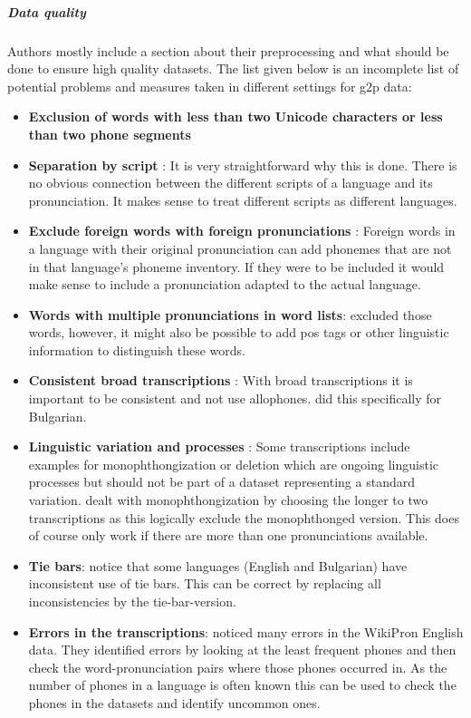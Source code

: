 \subparagraph{Data quality}
\label{data_qual}
Authors mostly include a section about their preprocessing and what should be done to ensure high quality datasets. The list given below is an incomplete list of potential problems and measures taken in different settings for \ac{g2p} data:

\begin{itemize}
\item \textbf{Exclusion of words with less than two Unicode characters or less than two phone segments} \citep{Ashby-Bartley.2021} 
\item \textbf{Separation by script} \citep{Ashby-Bartley.2021}: It is very straightforward why this is done. There is no obvious connection between the different scripts of a language and its pronunciation. It makes sense to treat different scripts as different languages. 
\item \textbf{Exclude foreign words with foreign pronunciations} \citep{Ashby-Bartley.2021}: Foreign words in a language with their original pronunciation can add phonemes that are not in that language's phoneme inventory. If they were to be included it would make sense to include a pronunciation adapted to the actual language.
\item \textbf{Words with multiple pronunciations in word lists}: \cite{Ashby-Bartley.2021} excluded those words, however, it might also be possible to add \ac{pos} tags or other linguistic information to distinguish these words.
\item \textbf{Consistent broad transcriptions} \citep{Ashby-Bartley.2021}: With broad transcriptions it is important to be consistent and not use allophones. \cite{Ashby-Bartley.2021} did this specifically for Bulgarian.
\item \textbf{Linguistic variation and processes} \citep{Ashby-Bartley.2021}: Some transcriptions include examples for monophthongization or deletion which are ongoing linguistic processes but should not be part of a dataset representing a standard variation. \cite{Ashby-Bartley.2021} dealt with monophthongization by choosing the longer to two transcriptions as this logically exclude the monophthonged version. This does of course only work if there are more than one pronunciations available. 
\item \textbf{Tie bars}: \cite{Ashby-Bartley.2021} notice that some languages (English and Bulgarian) have inconsistent use of tie bars. This can be correct by replacing all inconsistencies by the tie-bar-version.
\item \textbf{Errors in the transcriptions}: \citet{gautam.2021} noticed many errors in the WikiPron English data. They identified errors by looking at the least frequent phones and then check the word-pronunciation pairs where those phones occurred in. As the number of phones in a language is often known this can be used to check the phones in the datasets and identify uncommon ones. 
\end{itemize}

